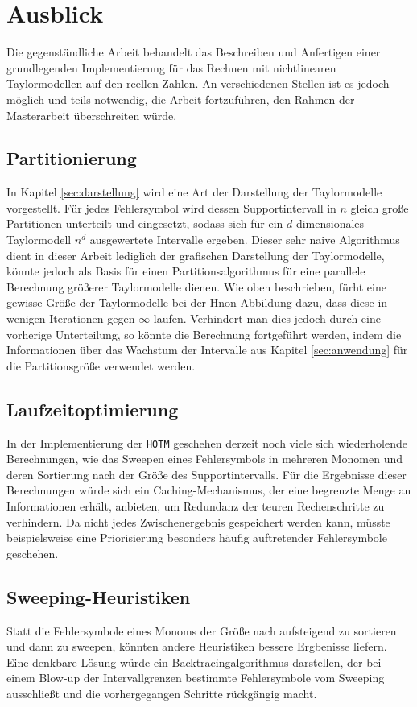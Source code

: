 \section{Ausblick}
Die gegenständliche Arbeit behandelt das Beschreiben und Anfertigen einer grundlegenden Implementierung für das Rechnen mit nichtlinearen Taylormodellen auf den reellen Zahlen. An verschiedenen Stellen ist es jedoch möglich und teils notwendig, die Arbeit fortzuführen, den Rahmen der Masterarbeit überschreiten würde.

\subsection*{Partitionierung}
In Kapitel \ref{sec:darstellung} wird eine Art der Darstellung der Taylormodelle vorgestellt. Für jedes Fehlersymbol wird dessen Supportintervall in $n$ gleich große Partitionen unterteilt und eingesetzt, sodass sich für ein $d$-dimensionales Taylormodell $n^d$ ausgewertete Intervalle ergeben. Dieser sehr naive Algorithmus dient in dieser Arbeit lediglich der grafischen Darstellung der Taylormodelle, könnte jedoch als Basis für einen Partitionsalgorithmus für eine parallele Berechnung größerer Taylormodelle dienen. Wie oben beschrieben, fürht eine gewisse Größe der Taylormodelle bei der H\e non-Abbildung dazu, dass diese in wenigen Iterationen gegen $\infty$ laufen. Verhindert man dies jedoch durch eine vorherige Unterteilung, so könnte die Berechnung fortgeführt werden, indem die Informationen über das Wachstum der Intervalle aus Kapitel \ref{sec:anwendung} für die Partitionsgröße verwendet werden.


\subsection*{Laufzeitoptimierung} 
In der Implementierung der \verb+HOTM+ geschehen derzeit noch viele sich wiederholende Berechnungen, wie das Sweepen eines Fehlersymbols in mehreren Monomen und deren Sortierung nach der Größe des Supportintervalls. Für die Ergebnisse dieser Berechnungen würde sich ein Caching-Mechanismus, der eine begrenzte Menge an Informationen erhält, anbieten, um Redundanz der teuren Rechenschritte zu verhindern. Da nicht jedes Zwischenergebnis gespeichert werden kann, müsste beispielsweise eine Priorisierung besonders häufig auftretender Fehlersymbole geschehen.


\subsection*{Sweeping-Heuristiken}
Statt die Fehlersymbole eines Monoms der Größe nach aufsteigend zu sortieren und dann zu sweepen, könnten andere Heuristiken bessere Ergbenisse liefern. Eine denkbare Lösung würde ein Backtracingalgorithmus darstellen, der bei einem Blow-up der Intervallgrenzen bestimmte Fehlersymbole vom Sweeping ausschließt und die vorhergegangen Schritte rückgängig macht.


